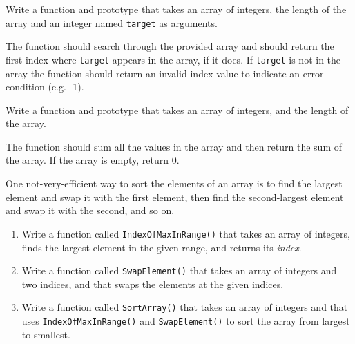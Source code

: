 \begin{exercise}
Write a function and prototype that takes an array of integers, the length of the array and an integer named
{\tt target} as arguments. 

The function should search through the provided array and should return the first index where
{\tt target} appears in the array, if it does. If {\tt target} is not in the array the function should 
return an invalid index value to indicate an error condition  (e.g.  -1).
\end{exercise}


\begin{exercise}
	Write a function and prototype that takes an array of integers, and the length of the array.
	
	The function should sum all the values in the array and then return the sum of the array. If the array is empty, return 0.
\end{exercise}

\begin{exercise}

One not-very-efficient way to sort the elements of an array
is to find the largest element and swap it with the first
element, then find the second-largest element and swap it with
the second, and so on.

\begin{enumerate}

\item Write a function called {\tt IndexOfMaxInRange()} that 
takes an array of integers, finds the
largest element in the given range, and returns its {\em index}.

\item Write a function called {\tt SwapElement()} that takes an
array of integers and two indices, and that swaps the elements
at the given indices.

\item Write a function called {\tt SortArray()} that takes an array of
integers and that uses {\tt IndexOfMaxInRange()} and {\tt SwapElement()}
to sort the array from largest to smallest.

\end{enumerate}
\end{exercise}



